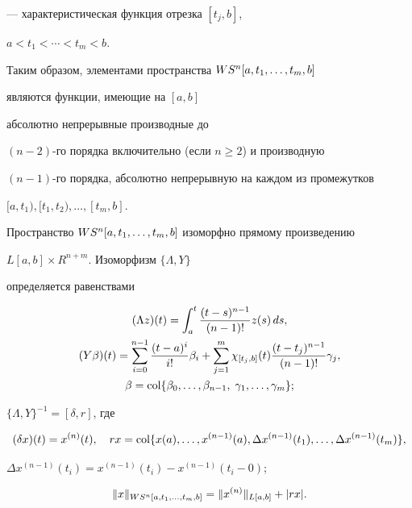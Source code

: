 --- характеристическая функция отрезка $[t_j,b]$,


$a<t_1<\dotsb<t_m<b$.


Таким образом, элементами пространства $WS^n[a,t_1,\dotsc,t_m,b]$


являются функции, имеющие на $[a,b]$


абсолютно непрерывные производные до


$(n-2)$-го порядка включительно (если $n\geq 2$) и производную


$(n-1)$-го порядка, абсолютно непрерывную на каждом из промежутков


$[a,t_1), [t_1,t_2), \dotsc, [t_m,b]$.





Пространство $WS^n[a,t_1,\dotsc,t_m,b]$ изоморфно прямому произведению


$L[a,b]\times R^{n+m}$. Изоморфизм $\{\Lambda,Y\}$


определяется равенствами


\begin{gather*}


(\Lambda z)(t) = \int_a^t \frac{(t-s)^{n-1}}{(n-1)!} z(s)\,ds,\\


%


(Y\beta)(t) = \sum_{i=0}^{n-1} \frac{(t-a)^i}{i!} \beta_i + \sum_{j=1}^m


\chi_{[t_j,b]}(t) \frac{(t-t_j)^{n-1}}{(n-1)!} \gamma_j,\\


%


\beta= \col\{\beta_0,\dotsc, \beta_{n-1},\; \gamma_1,\dotsc,\gamma_m\};


\end{gather*}


$\{\Lambda,Y\}^{-1} = [\delta,r]$, где


$$


(\delta x)(t) = x^{(n)} (t),\quad


rx = \col \{x(a),\dotsc,x^{(n-1)}(a),


\Delta x^{(n-1)}(t_1),\dotsc,\Delta x^{(n-1)}(t_m)\},


$$


$\Delta x^{(n-1)}(t_i) = x^{(n-1)}(t_i) - x^{(n-1)}(t_i-0)$;


$$


\|x\|_{\wsn}=\|x^{(n)}\|_{L[a,b]} + |rx|.


$$





